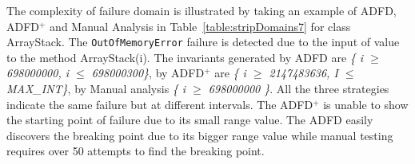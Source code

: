 \documentclass[runningheads,a4paper]{llncs}
\begin{document}

The complexity of failure domain is illustrated by taking an example of ADFD, ADFD$^+$ and Manual Analysis in Table~\ref{table:stripDomains7} for class ArrayStack. The \verb+OutOfMemoryError+ failure is detected due to the input of value to the method ArrayStack(i). The invariants generated by ADFD are \textit{\{ i $\ge$ 698000000, i $\le$ 698000300\}}, by ADFD$^+$ are \textit{\{ i $\ge$ 2147483636, I $\le$ MAX\_INT\}}, by Manual analysis \textit{\{ i $\ge$ 698000000 \}}. All the three strategies indicate the same failure but at different intervals. The ADFD$^+$ is unable to show the starting point of failure due to its small range value. The ADFD easily discovers the breaking point due to its bigger range value while manual testing requires over 50 attempts to find the breaking point.





\end{document}
